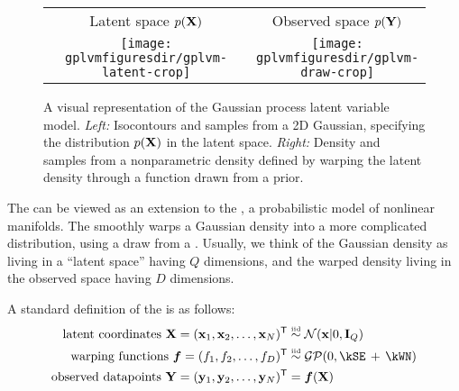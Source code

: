 \begin{figure}
\begin{centering}
{\begin{tabular}{cccc}
\phantom{h} & Latent space $p(\mathbf{X})$ & & Observed space $p(\mathbf{Y})$ \\
& \fbox{\texttt{[image: \\gplvmfiguresdir/gplvm-latent-crop]}} &
\raisebox{7em}{$\overset{\mathlarger{f(x)}}{\mathlarger{\mathlarger{\mathlarger{\mathlarger{\mathlarger{\mathlarger{\mathlarger{\rightarrow}}}}}}}}$} &
\fbox{\texttt{[image: \\gplvmfiguresdir/gplvm-draw-crop]}}
\end{tabular}}
\end{centering}
\caption[Two-dimensional Gaussian process latent variable model]{A visual representation of the Gaussian process latent variable model.
\emph{Left:}  Isocontours and samples from a 2D Gaussian, specifying the distribution $p(\mathbf{X})$ in the latent space. 
\emph{Right:} Density and samples from a nonparametric density defined by warping the latent density through a function drawn from a \gp{} prior.}  
\label{fig:twod-gplvm}
\end{figure}



The \iwmm{} can be viewed as an extension to the \gplvm{}, a probabilistic model of nonlinear manifolds.
The \gplvm{} smoothly warps a Gaussian density into a more complicated distribution, using a draw from a \gp{}.
Usually, we think of the Gaussian density as living in a ``latent space'' having $Q$ dimensions, and the warped density living in the observed space having $D$ dimensions.

A standard definition of the \gplvm{} is as follows:
%
\begin{align}
\textnormal{latent coordinates } \vX = (\vx_1, \vx_2, \ldots, \vx_{N})\tra & \simiid \N{\vx}{0}{\vI_Q} \\
\textnormal{warping functions } \vf = (f_1, f_2, \ldots, f_D)\tra & \simiid \GPt{0}{\kSE \kernplus \kWN} \\
\textnormal{observed datapoints } \vY = (\vy_1, \vy_2, \ldots, \vy_N)\tra & = \vf(\vX)
\end{align}


